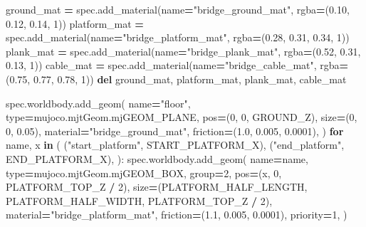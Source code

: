 \documentclass[
  american,
  11pt,
  letterpaper,
]{article}
\newenvironment{Shaded}{\begin{snugshade}}{\end{snugshade}}
\newcommand{\BuiltInTok}[1]{#1}
\newcommand{\ControlFlowTok}[1]{\textcolor[rgb]{0.13,0.29,0.53}{\textbf{#1}}}
\newcommand{\DecValTok}[1]{\textcolor[rgb]{0.00,0.00,0.81}{#1}}
\newcommand{\FloatTok}[1]{\textcolor[rgb]{0.00,0.00,0.81}{#1}}
\newcommand{\KeywordTok}[1]{\textcolor[rgb]{0.13,0.29,0.53}{\textbf{#1}}}
\newcommand{\NormalTok}[1]{#1}
\newcommand{\OperatorTok}[1]{\textcolor[rgb]{0.81,0.36,0.00}{\textbf{#1}}}
\newcommand{\StringTok}[1]{\textcolor[rgb]{0.31,0.60,0.02}{#1}}
\renewenvironment{Shaded}{\par\smallskip}{\par\smallskip}
\begin{document}
\begin{Shaded}
\begin{Highlighting}[]
\NormalTok{    ground\_mat }\OperatorTok{=}\NormalTok{ spec.add\_material(name}\OperatorTok{=}\StringTok{"bridge\_ground\_mat"}\NormalTok{, rgba}\OperatorTok{=}\NormalTok{(}\FloatTok{0.10}\NormalTok{, }\FloatTok{0.12}\NormalTok{, }\FloatTok{0.14}\NormalTok{, }\DecValTok{1}\NormalTok{))}
\NormalTok{    platform\_mat }\OperatorTok{=}\NormalTok{ spec.add\_material(name}\OperatorTok{=}\StringTok{"bridge\_platform\_mat"}\NormalTok{, rgba}\OperatorTok{=}\NormalTok{(}\FloatTok{0.28}\NormalTok{, }\FloatTok{0.31}\NormalTok{, }\FloatTok{0.34}\NormalTok{, }\DecValTok{1}\NormalTok{))}
\NormalTok{    plank\_mat }\OperatorTok{=}\NormalTok{ spec.add\_material(name}\OperatorTok{=}\StringTok{"bridge\_plank\_mat"}\NormalTok{, rgba}\OperatorTok{=}\NormalTok{(}\FloatTok{0.52}\NormalTok{, }\FloatTok{0.31}\NormalTok{, }\FloatTok{0.13}\NormalTok{, }\DecValTok{1}\NormalTok{))}
\NormalTok{    cable\_mat }\OperatorTok{=}\NormalTok{ spec.add\_material(name}\OperatorTok{=}\StringTok{"bridge\_cable\_mat"}\NormalTok{, rgba}\OperatorTok{=}\NormalTok{(}\FloatTok{0.75}\NormalTok{, }\FloatTok{0.77}\NormalTok{, }\FloatTok{0.78}\NormalTok{, }\DecValTok{1}\NormalTok{))}
    \KeywordTok{del}\NormalTok{ ground\_mat, platform\_mat, plank\_mat, cable\_mat}

\NormalTok{    spec.worldbody.add\_geom(}
\NormalTok{        name}\OperatorTok{=}\StringTok{"floor"}\NormalTok{,}
        \BuiltInTok{type}\OperatorTok{=}\NormalTok{mujoco.mjtGeom.mjGEOM\_PLANE,}
\NormalTok{        pos}\OperatorTok{=}\NormalTok{(}\DecValTok{0}\NormalTok{, }\DecValTok{0}\NormalTok{, GROUND\_Z),}
\NormalTok{        size}\OperatorTok{=}\NormalTok{(}\DecValTok{0}\NormalTok{, }\DecValTok{0}\NormalTok{, }\FloatTok{0.05}\NormalTok{),}
\NormalTok{        material}\OperatorTok{=}\StringTok{"bridge\_ground\_mat"}\NormalTok{,}
\NormalTok{        friction}\OperatorTok{=}\NormalTok{(}\FloatTok{1.0}\NormalTok{, }\FloatTok{0.005}\NormalTok{, }\FloatTok{0.0001}\NormalTok{),}
\NormalTok{    )}
    \ControlFlowTok{for}\NormalTok{ name, x }\KeywordTok{in}\NormalTok{ (}
\NormalTok{        (}\StringTok{"start\_platform"}\NormalTok{, START\_PLATFORM\_X),}
\NormalTok{        (}\StringTok{"end\_platform"}\NormalTok{, END\_PLATFORM\_X),}
\NormalTok{    ):}
\NormalTok{        spec.worldbody.add\_geom(}
\NormalTok{            name}\OperatorTok{=}\NormalTok{name,}
            \BuiltInTok{type}\OperatorTok{=}\NormalTok{mujoco.mjtGeom.mjGEOM\_BOX,}
\NormalTok{            group}\OperatorTok{=}\DecValTok{2}\NormalTok{,}
\NormalTok{            pos}\OperatorTok{=}\NormalTok{(x, }\DecValTok{0}\NormalTok{, PLATFORM\_TOP\_Z }\OperatorTok{/} \DecValTok{2}\NormalTok{),}
\NormalTok{            size}\OperatorTok{=}\NormalTok{(PLATFORM\_HALF\_LENGTH, PLATFORM\_HALF\_WIDTH, PLATFORM\_TOP\_Z }\OperatorTok{/} \DecValTok{2}\NormalTok{),}
\NormalTok{            material}\OperatorTok{=}\StringTok{"bridge\_platform\_mat"}\NormalTok{,}
\NormalTok{            friction}\OperatorTok{=}\NormalTok{(}\FloatTok{1.1}\NormalTok{, }\FloatTok{0.005}\NormalTok{, }\FloatTok{0.0001}\NormalTok{),}
\NormalTok{            priority}\OperatorTok{=}\DecValTok{1}\NormalTok{,}
\NormalTok{        )}


\end{Highlighting}
\end{Shaded}
\end{document}

